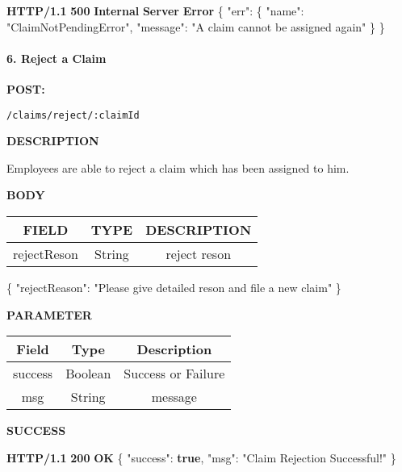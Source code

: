 \documentclass[
]{article}
\newenvironment{Shaded}{}{}
\newcommand{\DataTypeTok}[1]{\textcolor[rgb]{0.56,0.13,0.00}{#1}}
\newcommand{\ErrorTok}[1]{\textcolor[rgb]{1.00,0.00,0.00}{\textbf{#1}}}
\newcommand{\FunctionTok}[1]{\textcolor[rgb]{0.02,0.16,0.49}{#1}}
\newcommand{\KeywordTok}[1]{\textcolor[rgb]{0.00,0.44,0.13}{\textbf{#1}}}
\newcommand{\StringTok}[1]{\textcolor[rgb]{0.25,0.44,0.63}{#1}}
\begin{document}
\begin{Shaded}
\begin{Highlighting}[]
\ErrorTok{HTTP/1.1} \ErrorTok{500} \ErrorTok{Internal} \ErrorTok{Server} \ErrorTok{Error}
\FunctionTok{\{}
    \DataTypeTok{"err"}\FunctionTok{:} \FunctionTok{\{}
        \DataTypeTok{"name"}\FunctionTok{:} \StringTok{"ClaimNotPendingError"}\FunctionTok{,}
        \DataTypeTok{"message"}\FunctionTok{:} \StringTok{"A claim cannot be assigned again"}
    \FunctionTok{\}}
\FunctionTok{\}}
\end{Highlighting}
\end{Shaded}

\hypertarget{header-n968}{%
\paragraph{6. Reject a Claim}\label{header-n968}}

\textbf{POST:}

\begin{verbatim}
/claims/reject/:claimId
\end{verbatim}

\textbf{DESCRIPTION}

Employees are able to reject a claim which has been assigned to him.

\textbf{BODY}

\begin{longtable}[]{@{}ccc@{}}
\toprule
FIELD & TYPE & DESCRIPTION\tabularnewline
\midrule
\endhead
rejectReson & String & reject reson\tabularnewline
\bottomrule
\end{longtable}

\begin{Shaded}
\begin{Highlighting}[]
\FunctionTok{\{}
	\DataTypeTok{"rejectReason"}\FunctionTok{:} \StringTok{"Please give detailed reson and file a new claim"}
\FunctionTok{\}}
\end{Highlighting}
\end{Shaded}

\textbf{PARAMETER}

\begin{longtable}[]{@{}ccc@{}}
\toprule
Field & Type & Description\tabularnewline
\midrule
\endhead
success & Boolean & Success or Failure\tabularnewline
msg & String & message\tabularnewline
\bottomrule
\end{longtable}

\textbf{SUCCESS}

\begin{Shaded}
\begin{Highlighting}[]
\ErrorTok{HTTP/1.1} \ErrorTok{200} \ErrorTok{OK}
\FunctionTok{\{}
    \DataTypeTok{"success"}\FunctionTok{:} \KeywordTok{true}\FunctionTok{,}
    \DataTypeTok{"msg"}\FunctionTok{:} \StringTok{"Claim Rejection Successful!"}
\FunctionTok{\}}
\end{Highlighting}
\end{Shaded}
\end{document}
